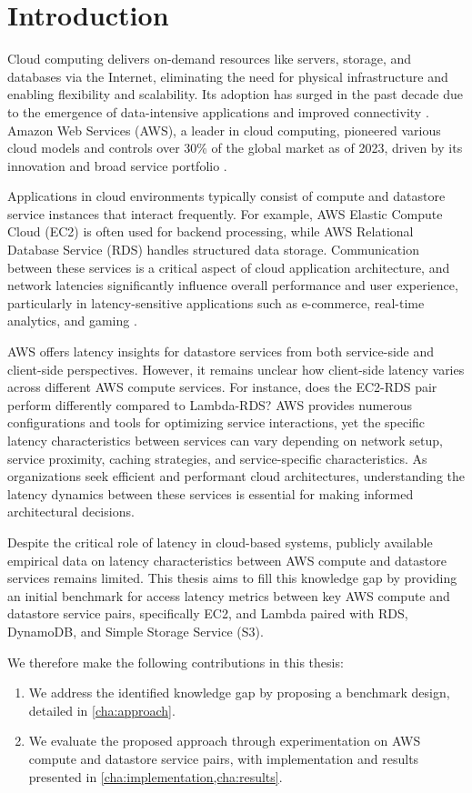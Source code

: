 \section{Introduction}
\label{cha:intro}

Cloud computing delivers on-demand resources like servers, storage, and databases via the Internet, eliminating the need for physical infrastructure and enabling flexibility and scalability. Its adoption has surged in the past decade due to the emergence of data-intensive applications and improved connectivity \cite{}. Amazon Web Services (AWS), a leader in cloud computing, pioneered various cloud models and controls over 30\% of the global market as of 2023, driven by its innovation and broad service portfolio \cite{}.

Applications in cloud environments typically consist of compute and datastore service instances that interact frequently. For example, AWS Elastic Compute Cloud (EC2) is often used for backend processing, while AWS Relational Database Service (RDS) handles structured data storage. Communication between these services is a critical aspect of cloud application architecture, and network latencies significantly influence overall performance and user experience, particularly in latency-sensitive applications such as e-commerce, real-time analytics, and gaming \cite{}.

AWS offers latency insights for datastore services from both service-side and client-side perspectives. However, it remains unclear how client-side latency varies across different AWS compute services. For instance, does the EC2-RDS pair perform differently compared to Lambda-RDS? AWS provides numerous configurations and tools for optimizing service interactions, yet the specific latency characteristics between services can vary depending on network setup, service proximity, caching strategies, and service-specific characteristics. As organizations seek efficient and performant cloud architectures, understanding the latency dynamics between these services is essential for making informed architectural decisions.

Despite the critical role of latency in cloud-based systems, publicly available empirical data on latency characteristics between AWS compute and datastore services remains limited. This thesis aims to fill this knowledge gap by providing an initial benchmark for access latency metrics between key AWS compute and datastore service pairs, specifically EC2, and Lambda paired with RDS, DynamoDB, and Simple Storage Service (S3).

We therefore make the following contributions in this thesis:
\begin{enumerate}
	\item We address the identified knowledge gap by proposing a benchmark design, detailed in \cref{cha:approach}.
	\item We evaluate the proposed approach through experimentation on AWS compute and datastore service pairs, with implementation and results presented in \cref{cha:implementation,cha:results}.
\end{enumerate}
